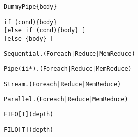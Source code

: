 \begin{table*}
\newsavebox{\pipeSignature}
\begin{lrbox}{\pipeSignature}
\begin{lstlisting}[language=SpatialTable]
DummyPipe{body}
\end{lstlisting}
\end{lrbox}

\newsavebox{\ifSignature}
\begin{lrbox}{\ifSignature}
\begin{lstlisting}[language=SpatialTable]
if (cond){body} 
[else if (cond){body} ] 
[else {body} ]
\end{lstlisting}
\end{lrbox}

\newsavebox{\sequentialTag}
\begin{lrbox}{\sequentialTag}
\begin{lstlisting}[language=SpatialTable]
Sequential.(Foreach|Reduce|MemReduce)
\end{lstlisting}
\end{lrbox}

\newsavebox{\pipeTag}
\begin{lrbox}{\pipeTag}
\begin{lstlisting}[language=SpatialTable]
Pipe(ii*).(Foreach|Reduce|MemReduce)
\end{lstlisting}
\end{lrbox}

\newsavebox{\streamTag}
\begin{lrbox}{\streamTag}
\begin{lstlisting}[language=SpatialTable]
Stream.(Foreach|Reduce|MemReduce)
\end{lstlisting}
\end{lrbox}

\newsavebox{\parallelTag}
\begin{lrbox}{\parallelTag}
\begin{lstlisting}[language=SpatialTable]
Parallel.(Foreach|Reduce|MemReduce)
\end{lstlisting}
\end{lrbox}

\newsavebox{\fifoSyntax}
\begin{lrbox}{\fifoSyntax}
\begin{lstlisting}[language=SpatialTable]
FIFO[T](depth)
\end{lstlisting}
\end{lrbox}

\newsavebox{\filoSyntax}
\begin{lrbox}{\filoSyntax}
\begin{lstlisting}[language=SpatialTable]
FILO[T](depth)
\end{lstlisting}
\end{lrbox}


\end{table*}
